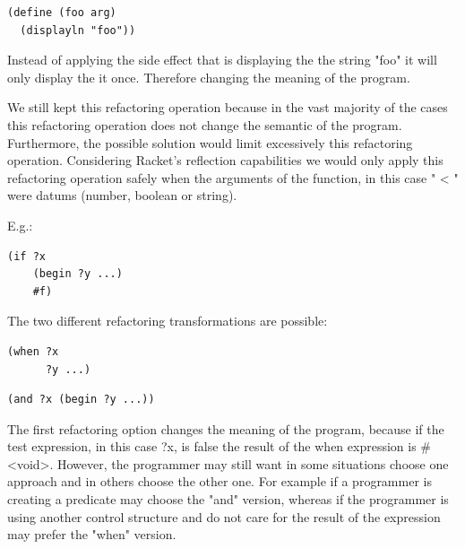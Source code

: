 \begin{lstlisting}[basicstyle=\ttfamily, caption="Foo"]
(define (foo arg)
  (displayln "foo"))
\end{lstlisting}

Instead of applying the side effect that is displaying the the string "foo"
 it will only display the it once. Therefore changing the meaning of the program.

We still kept this refactoring operation because in the vast majority
of the cases this refactoring operation does not change the semantic of the program.
Furthermore, the possible solution would limit excessively this refactoring operation.  %
Considering Racket's reflection capabilities we would only apply this refactoring operation
safely when the arguments of the function, in this case " < " were datums (number, boolean or string). %


E.g.:
\begin{lstlisting}[basicstyle=\ttfamily, caption="Code sample"]
(if ?x
    (begin ?y ...)
    #f)
\end{lstlisting}
The two different refactoring transformations are possible:
\begin{lstlisting}[basicstyle=\ttfamily, caption="Refactoring option 1"]
(when ?x
      ?y ...)
\end{lstlisting}

\begin{lstlisting}[basicstyle=\ttfamily, caption="Refactoring option 2"]
(and ?x (begin ?y ...))
\end{lstlisting}

The first refactoring option changes the meaning of the program, because if the
test expression, in this case ?x, is false the result of the when expression is \#<void>.
However, the programmer may still want in some situations choose one approach and in others
choose the other one. For example if a programmer is creating a predicate may
choose the "and" version, whereas if the programmer is using another control structure
and do not care for the result of the expression may prefer the "when" version.

